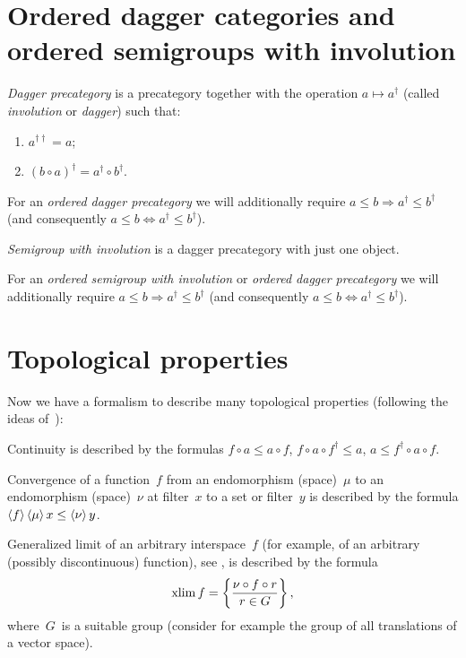 \chapter{Ordered dagger categories and ordered semigroups with involution}

\begin{defn}
\emph{Dagger precategory} is a precategory together with the operation $a\mapsto a^{\dagger}$ (called \emph{involution} or \emph{dagger}) such that:
\begin{enumerate}
\item $a^{\dagger\dagger} = a$;
\item $(b\circ a)^{\dagger} = a^{\dagger}\circ b^{\dagger}$.
\end{enumerate}
\end{defn}

For an \emph{ordered dagger precategory} we will additionally require $a\leq b\Rightarrow a^{\dagger}\leq b^{\dagger}$ (and consequently $a\leq b\Leftrightarrow a^{\dagger}\leq b^{\dagger}$).

\begin{defn}
\emph{Semigroup with involution} is a dagger precategory with just one object.
\end{defn}

For an \emph{ordered semigroup with involution} or \emph{ordered dagger precategory} we will additionally require $a\leq b\Rightarrow a^{\dagger}\leq b^{\dagger}$ (and consequently $a\leq b\Leftrightarrow a^{\dagger}\leq b^{\dagger}$).

\chapter{Topological properties}

Now we have a formalism to describe many topological properties (following the ideas of~\cite{volume-1}):

Continuity is described by the formulas $f\circ a\leq a\circ f$, $f\circ a\circ f^{\dagger}\leq a$, $a\leq f^{\dagger}\circ a\circ f$.

Convergence of a function~$f$ from an endomorphism (space)~$\mu$ to an endomorphism (space)~$\nu$ at filter~$x$ to a set or filter~$y$ is described by the formula $\left\langle f\right\rangle\left\langle \mu\right\rangle x\leq\left\langle \nu\right\rangle y$.

Generalized limit of an arbitrary interspace~$f$ (for example, of an arbitrary (possibly discontinuous) function), see \cite{limit}, is described by the formula \[ \operatorname{xlim} f=\left\{ \frac{\nu\circ f\circ r}{r\in G}\right\}, \]
where~$G$~is a suitable group (consider for example the group of all translations of a vector space).


